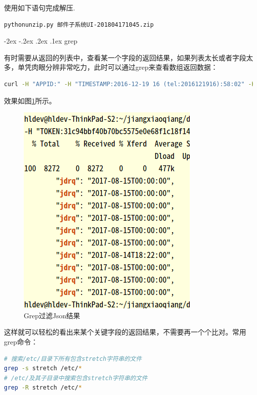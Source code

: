 \documentclass[12pt]{book}
\makeatletter
\numberwithin{dummy}{section}
\theoremstyle{ocrenumbox}
\theoremstyle{blacknumex}
\theoremstyle{blacknumbox}
\theoremstyle{ocrenum}
\renewcommand\paragraph{\@startsection{paragraph}{4}{\z@}
	{-2ex \@plus-.2ex \@minus .2ex}
	{.1ex}
	{\normalfont\small\sffamily\bfseries}}
\makeatother
\begin{document}
使用如下语句完成解压.

\begin{lstlisting}[language=Bash]
pythonunzip.py 邮件子系统UI-201804171045.zip
\end{lstlisting}

\paragraph{grep}

有时需要从返回的列表中，查看某一个字段的返回结果，如果列表太长或者字段太多，单凭肉眼分辨非常吃力，此时可以通过grep来查看数组返回数据：

\begin{lstlisting}[language=Bash]
curl -H "APPID:" -H "TIMESTAMP:2016-12-19 16 (tel:2016121916):58:02" -H "ECHOSTR:" -H "TOKEN:" http://10.10.1.12:28080/api/xzxk?xdr= | jq '.' |grep jdrq
\end{lstlisting}

效果如图\ref{fig:grepfilterreturnvalue}所示。

\begin{figure}[htbp]
	\centering
	\includegraphics[scale=0.5]{grepfilterreturnvalue.png}
	\caption{Grep过滤Json结果}
	\label{fig:grepfilterreturnvalue}
\end{figure}

这样就可以轻松的看出来某个关键字段的返回结果，不需要再一个个比对。常用grep命令：

\begin{lstlisting}[language=Bash]
# 搜索/etc/目录下所有包含stretch字符串的文件
grep -s stretch /etc/*
# /etc/及其子目录中搜索包含stretch字符串的文件
grep -R stretch /etc/*
\end{lstlisting}
\end{document}
